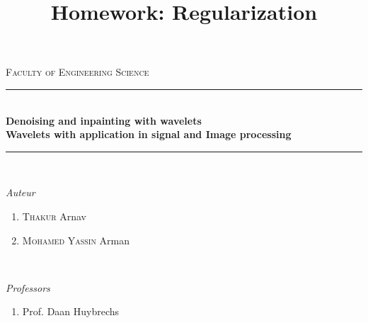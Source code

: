 \documentclass[a4paper]{article}
\title{Homework: Regularization} %
\begin{document}
	
	\begin{titlepage}
		
		\newcommand{\HRule}{\rule{\linewidth}{0.5mm}}  
		
		\begin{center}
			
			\textsc{\LARGE Faculty of Engineering Science}\\[1.5cm] 
			
			
			\HRule \\[0.1cm]
			
			{\huge{ \bfseries Denoising and inpainting with wavelets}} 
			\vspace{5pt}
			{\\ \Large{\bfseries Wavelets with application in signal and Image processing}}
			\HRule \\[1cm]
			
			\vspace*{0.1cm}
			
			\begin{minipage}{0.4\textwidth}
				\textit{Auteur}
				\begin{flushleft} \large
					\begin{enumerate}
						\item[] \textsc{Thakur} Arnav\\
                        \item[] \textsc{Mohamed Yassin} Arman\\

						
					\end{enumerate} 
				\end{flushleft}
			\end{minipage}\\[1cm]
			\begin{minipage}{0.4\textwidth}
				\textit{Professors}
				\begin{flushleft}
					\begin{enumerate}
						\item[] Prof. Daan Huybrechs\\
					\end{enumerate} 
				\end{flushleft}
			\end{minipage}\\
			
			\vspace*{1.5cm}
			

\end{center}
\end{titlepage}
\end{document}
